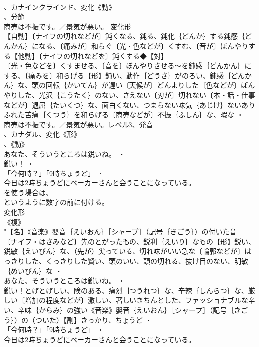 \documentclass[8pt]{extreport}
\begin{document}
\begin{CJK}{UTF8}{min}
\\	、カナインクラインド、変化《動》
\\	、分節
\\	商売は不振です。／景気が悪い。	変化形 
\\	【自動】〔ナイフの切れなどが〕鈍くなる、鈍る、鈍化｛どんか｝する鈍感｛どんかん｝になる、〔痛みが〕和らぐ〔光・色などが〕くすむ、〔音が〕ぼんやりする【他動】〔ナイフの切れなどを〕鈍くする◆【対】
\\	〔光・色などを〕くすませる、〔音を〕ぼんやりさせる～を鈍感｛どんかん｝にする、〔痛みを〕和らげる【形】鈍い、動作｛どうさ｝がのろい、鈍感｛どんかん｝な、頭の回転｛かいてん｝が遅い〔天候が〕どんよりした〔色などが〕ぼんやりした、光沢｛こうたく｝のない、さえない〔刃が〕切れない〔本・話・仕事などが〕退屈｛たいくつ｝な、面白くない、つまらない味気｛あじけ｝ないありふれた苦痛｛くつう｝を和らげる〔商売などが〕不振｛ふしん｝な、暇な ・
\\	商売は不振です。／景気が悪い。レベル3、発音
\\	、カナダル、変化《形》
\\	、《動》
\\	あなた、そういうところは鋭いね。 ・
\\	鋭い！ ・
\\	「今何時？」「9時ちょうど」 ・
\\	今日は2時ちょうどにベーカーさんと会うことになっている。
\\	を使う場合は、
\\	というように数字の前に付ける。
\\	変化形 
\\	《複》
\\	"【名】《音楽》嬰音｛えいおん｝［シャープ］（記号｛きごう｝）の付いた音
\\	〔ナイフ・はさみなど〕先のとがったもの、鋭利｛えいり｝なもの【形】鋭い、鋭敏｛えいびん｝な、（先が）尖っている、切れ味がいい急な〔輪郭などが〕はっきりした、くっきりした賢い、頭のいい、頭の切れる、抜け目のない、明敏｛めいびん｝な ・
\\	あなた、そういうところは鋭いね。 ・
\\	鋭い！とげとげしい、険のある、痛烈｛つうれつ｝な、辛辣｛しんらつ｝な、厳しい〔増加の程度などが〕激しい、著しいきちんとした、ファッショナブルな辛い、辛味｛からみ｝の強い《音楽》嬰音｛えいおん｝［シャープ］（記号｛きごう｝）の（ついた）【副】きっかり、ちょうど ・
\\	「今何時？」「9時ちょうど」 ・
\\	今日は2時ちょうどにベーカーさんと会うことになっている。

\end{CJK}
\end{document}
